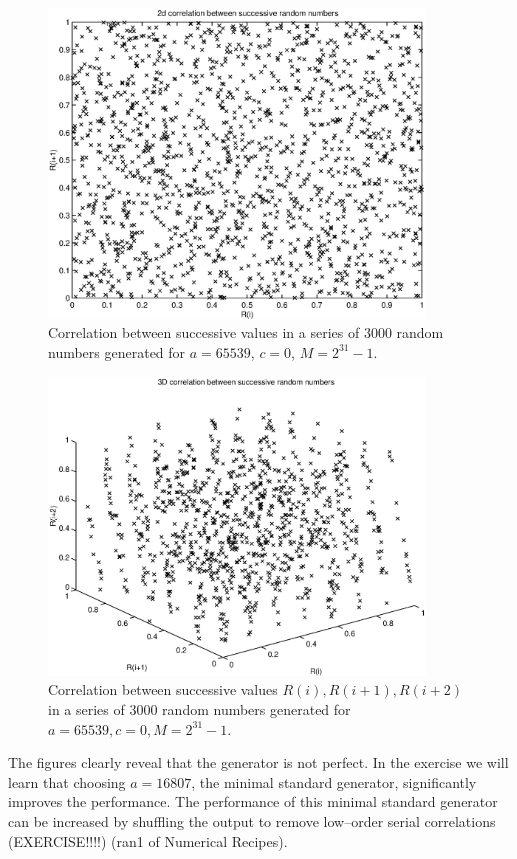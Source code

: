 \begin{figure}
\label{F_TRANDOM2_3}
\includegraphics[width=10cm]{./Figures/f_trandom2_3.eps}
\caption{Correlation between successive values in a series of 3000 
random numbers generated for $a=65539$, $c=0$, $M=2^{31}-1$.}
\end{figure}


\begin{figure}
\label{F_TRANDOM2_4}
\includegraphics[width=10cm]{./Figures/f_trandom2_4.eps}
\caption{Correlation between successive values 
$R(i),R(i+1), R(i+2)$ in a series of 3000 random numbers generated
for $a=65539, c=0, M=2^{31}-1$.}
\end{figure}

The figures clearly reveal that the generator is not perfect.
In the exercise we will learn that choosing $a=16807$, the minimal
standard generator, 
significantly improves the performance. The performance of 
this minimal standard generator can be increased by shuffling
the output to remove low--order serial correlations (EXERCISE!!!!)
({\sf ran1} of Numerical Recipes).

